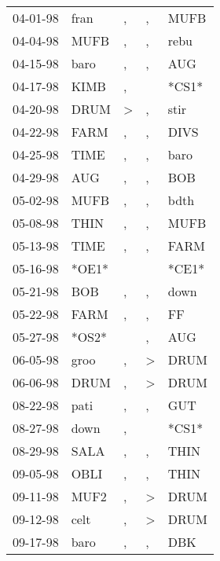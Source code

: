 \begin{supertabular}{lllll}
 04-01-98 &   fran &                , &             , &   MUFB \\
 04-04-98 &   MUFB &                , &             , &   rebu \\
 04-15-98 &   baro &                , &             , &    AUG \\
 04-17-98 &   KIMB &                , &               &  *CS1* \\
 04-20-98 &   DRUM &     \textgreater &             , &   stir \\
 04-22-98 &   FARM &                , &             , &   DIVS \\
 04-25-98 &   TIME &                , &             , &   baro \\
 04-29-98 &    AUG &                , &             , &    BOB \\
 05-02-98 &   MUFB &                , &             , &   bdth \\
 05-08-98 &   THIN &                , &             , &   MUFB \\
 05-13-98 &   TIME &                , &             , &   FARM \\
 05-16-98 &  *OE1* &                  &               &  *CE1* \\
 05-21-98 &    BOB &                , &             , &   down \\
 05-22-98 &   FARM &                , &             , &     FF \\
 05-27-98 &  *OS2* &                  &             , &    AUG \\
 06-05-98 &   groo &                , &  \textgreater &   DRUM \\
 06-06-98 &   DRUM &                , &  \textgreater &   DRUM \\
 08-22-98 &   pati &                , &             , &    GUT \\
 08-27-98 &   down &                , &               &  *CS1* \\
 08-29-98 &   SALA &                , &             , &   THIN \\
 09-05-98 &   OBLI &                , &             , &   THIN \\
 09-11-98 &   MUF2 &                , &  \textgreater &   DRUM \\
 09-12-98 &   celt &                , &  \textgreater &   DRUM \\
 09-17-98 &   baro &                , &             , &    DBK \\

\end{supertabular}
